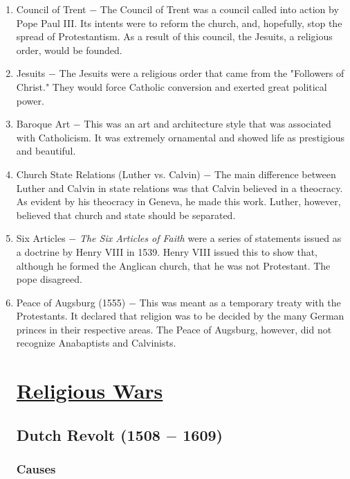 \documentclass[12pt]{article}
\begin{document}
\begin{enumerate}
\begin{enumerate}[label=\arabic{*}.]
\end{enumerate}
\setcounter{enumi}{114}
\item Council of Trent $-$ The Council of Trent was a council called into action by Pope Paul III. Its intents were to reform the church, and, hopefully, stop the spread of Protestantism. As a result of this council, the Jesuits, a religious order, would be founded.

\item Jesuits $-$ The Jesuits were a religious order that came from the "Followers of Christ." They would force Catholic conversion and exerted great political power.

\item Baroque Art $-$ This was an art and architecture style that was associated with Catholicism. It was extremely ornamental and showed life as prestigious and beautiful.

\item Church State Relations (Luther vs. Calvin) $-$ The main difference between Luther and Calvin in state relations was that Calvin believed in a theocracy. As evident by his theocracy in Geneva, he made this work. Luther, however, believed that church and state should be separated.

\item Six Articles $-$ \textit{The Six Articles of Faith} were a series of statements issued as a doctrine by Henry VIII in 1539. Henry VIII issued this to show that, although he formed the Anglican church, that he was not Protestant. The pope disagreed.

\item Peace of Augsburg (1555) $-$ This was meant as a temporary treaty with the Protestants. It declared that religion was to be decided by the many German princes in their respective areas. The Peace of Augsburg, however, did not recognize Anabaptists and Calvinists.

\section{\underline{Religious Wars}}

\subsection{Dutch Revolt (1508 $-$ 1609)}

\subsubsection{Causes}


\end{enumerate}
\end{document}
